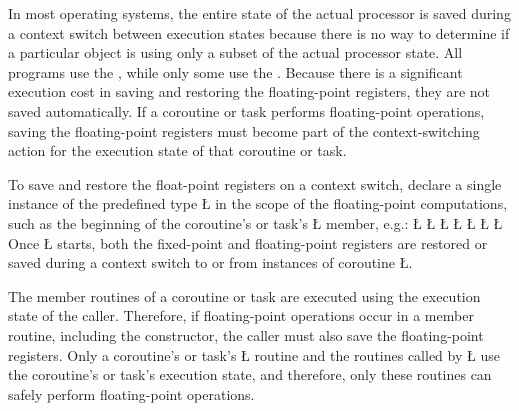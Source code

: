\documentclass[openright,twoside]{report}
\begin{document}
In most operating systems, the entire state of the actual processor is saved during a context switch between execution states because there is no way to determine if a particular object is using only a subset of the actual processor state.
All programs use the , while only some use the .
Because there is a significant execution cost in saving and restoring the floating-point registers, they are not saved automatically.
If a coroutine or task performs floating-point operations, saving the floating-point registers must become part of the context-switching action for the execution state of that coroutine or task.

To save and restore the float-point registers on a context switch, declare a single instance of the predefined type \LGinlinetrue\LGbegin\lgrinde\L{}\endlgrinde\LGend{} in the scope of the floating-point computations, such as the beginning of the coroutine's or task's \LGinlinetrue\LGbegin\lgrinde\L{}\endlgrinde\LGend{} member, e.g.:
\LGinlinefalse\LGbegin\lgrinde
\L{}
\L{\LB{}}
\L{\LB{}}
\CE{}\L{\LB{}}
\CE{}\L{\LB{}}
\L{\LB{}}
\L{\LB{\};}}
\endlgrinde\LGend
Once \LGinlinetrue\LGbegin\lgrinde\L{}\endlgrinde\LGend{} starts, both the fixed-point and floating-point registers are restored or saved during a context switch to or from instances of coroutine \LGinlinetrue\LGbegin\lgrinde\L{}\endlgrinde\LGend{}.

\begin{annotation}
 The member routines of a coroutine or task are executed using the execution state of the caller.
Therefore, if floating-point operations occur in a member routine, including the constructor, the caller must also save the floating-point registers.
Only a coroutine's or task's \LGinlinetrue\LGbegin\lgrinde\L{}\endlgrinde\LGend{} routine and the routines called by \LGinlinetrue\LGbegin\lgrinde\L{}\endlgrinde\LGend{} use the coroutine's or task's execution state, and therefore, only these routines can safely perform floating-point operations.
\end{annotation}
\end{document}

